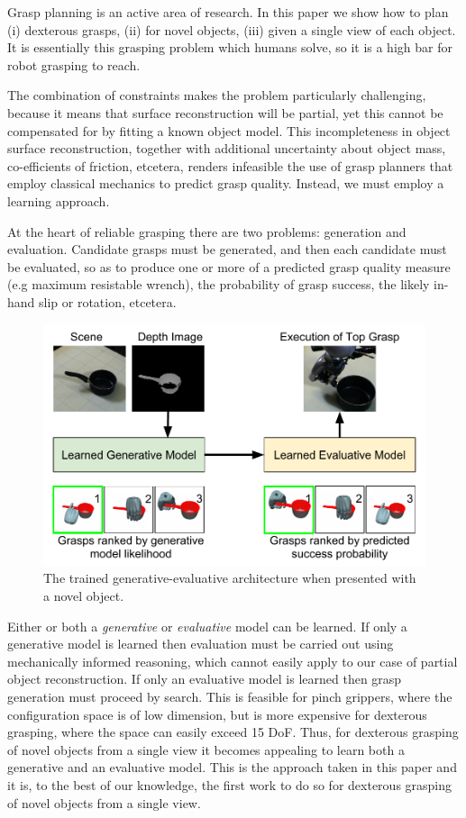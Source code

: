 Grasp planning is an active area of research. In this paper we show how to plan (i) dexterous grasps, (ii) for novel objects, (iii) given a single view of each object. It is essentially this grasping problem which humans solve, so it is a high bar for robot grasping to reach. 

The combination of constraints makes the problem particularly challenging, because it means that surface reconstruction will be partial, yet this cannot be compensated for by fitting a known object model. This incompleteness in object surface reconstruction, together with additional uncertainty about object mass, co-efficients of friction, etcetera, renders infeasible the use of grasp planners that employ classical mechanics to predict grasp quality. Instead, we must employ a learning approach.

At the heart of reliable grasping there are two problems: generation and evaluation. Candidate grasps must be generated, and then each candidate must be evaluated, so as to produce one or more of a predicted grasp quality measure (e.g maximum resistable wrench), the probability of grasp success, the likely in-hand slip or rotation, etcetera. 
\begin{figure}[t]
  \includegraphics[width=\columnwidth]{images/contribution.pdf}
  \caption{The trained generative-evaluative architecture when presented with a novel object.}
\label{fig:systemArchitecture}
\end{figure}
Either or both a {\em generative} or {\em evaluative} model can be learned. If only a generative model is learned then evaluation must be carried out using mechanically informed reasoning, which cannot easily apply to our case of partial object reconstruction. If only an evaluative model is learned then grasp generation must proceed by search. This is feasible for pinch grippers, where the configuration space is of low dimension, but is more expensive for dexterous grasping, where the space can easily exceed 15 DoF. Thus, for dexterous grasping of novel objects from a single view it becomes appealing to learn both a generative and an evaluative model. This is the approach taken in this paper and it is, to the best of our knowledge, the first work to do so for dexterous grasping of novel objects from a single view.

